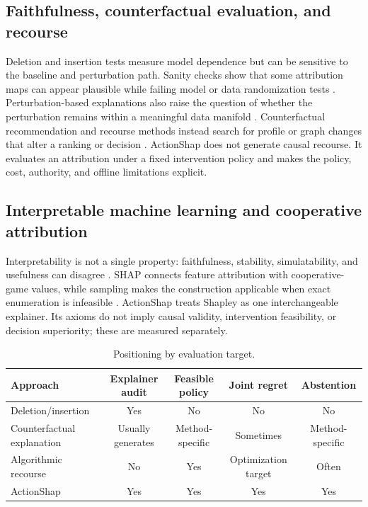 \documentclass[pdflatex,sn-basic,Numbered]{sn-jnl}
\begin{document}
\subsection{Faithfulness, counterfactual evaluation, and recourse}
Deletion and insertion tests measure model dependence but can be sensitive to the baseline and perturbation path. Sanity checks show that some attribution maps can appear plausible while failing model or data randomization tests \citep{adebayo2018}. Perturbation-based explanations also raise the question of whether the perturbation remains within a meaningful data manifold \citep{hooker2019}. Counterfactual recommendation and recourse methods instead search for profile or graph changes that alter a ranking or decision \citep{ghazimatin2020,tran2021,tan2021,yao2022,baklanov2024,barkan2024,gurevitch2025,mohammadi2025,nguyen2026,wachter2017,karimi2021}. ActionShap does not generate causal recourse. It evaluates an attribution under a fixed intervention policy and makes the policy, cost, authority, and offline limitations explicit.

\subsection{Interpretable machine learning and cooperative attribution}
Interpretability is not a single property: faithfulness, stability, simulatability, and usefulness can disagree \citep{gilpin2018,arrieta2020,molnar2022,samek2017,deyoung2020}. SHAP connects feature attribution with cooperative-game values, while sampling makes the construction applicable when exact enumeration is infeasible \citep{shapley1953,castro2009,lundberg2020,covert2021}. ActionShap treats Shapley as one interchangeable explainer. Its axioms do not imply causal validity, intervention feasibility, or decision superiority; these are measured separately.

\begin{table}[t]
\centering
\small
\caption{Positioning by evaluation target.}
\label{tab:positioning}
\begin{tabular}{lcccc}
\toprule
Approach & Explainer audit & Feasible policy & Joint regret & Abstention\\
\midrule
Deletion/insertion & Yes & No & No & No\\
Counterfactual explanation & Usually generates & Method-specific & Sometimes & Method-specific\\
Algorithmic recourse & No & Yes & Optimization target & Often\\
ActionShap & Yes & Yes & Yes & Yes\\
\bottomrule
\end{tabular}
\end{table}
\end{document}
